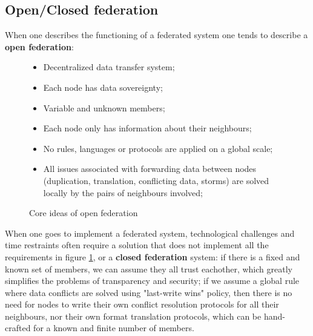 \documentclass[journal]{IEEEtran}
\begin{document}
\subsection{Open/Closed federation}

When one describes the functioning of a federated system one tends to describe a \textbf{open federation}:

\begin{figure}[h]

	\begin{itemize}

		\item Decentralized data transfer system;

		\item Each node has data sovereignty;

		\item Variable and unknown members;

		\item Each node only has information about their neighbours;

		\item No rules, languages or protocols are applied on a global scale;

		\item All issues associated with forwarding data between nodes (duplication, translation, conflicting data, storms) are solved locally by the pairs of neighbours involved;

	\end{itemize}
	\caption{Core ideas of open federation}
	\label{list:FEDOPEN}

\end{figure}


When one goes to implement a federated system, technological challenges and time restraints often require a solution that does not implement all the requirements in figure \ref{list:FEDOPEN}, or a \textbf{closed federation} system: if there is a fixed and known set of members, we can assume they all trust eachother, which greatly simplifies the problems of transparency and security; if we assume a global rule where data conflicts are solved using "last-write wins" policy, then there is no need for nodes to write their own conflict resolution protocols for all their neighbours, nor their own format translation protocols, which can be hand-crafted  for a known and finite number of members.
\end{document}
